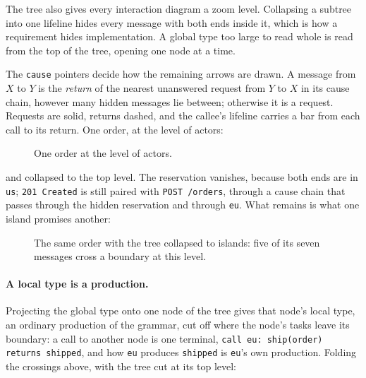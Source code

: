 The tree also gives every interaction diagram a zoom level. Collapsing a subtree
into one lifeline hides every message with both ends inside it, which is how a
requirement hides implementation. A global type too large to read whole is read
from the top of the tree, opening one node at a time.

The \texttt{cause} pointers decide how the remaining arrows are drawn. A message
from $X$ to $Y$ is the \emph{return} of the nearest unanswered request from $Y$
to $X$ in its cause chain, however many hidden messages lie between; otherwise
it is a request. Requests are solid, returns dashed, and the callee's lifeline
carries a bar from each call to its return. One order, at the level of actors:

\begin{figure}[htbp]
\centering
{}
\caption{One order at the level of actors.}
\label{fig:topology-actors}
\end{figure}

and collapsed to the top level. The reservation vanishes, because both ends are
in \texttt{us}; \texttt{201 Created} is still paired with \texttt{POST /orders},
through a cause chain that passes through the hidden reservation and through
\texttt{eu}. What remains is what one island promises another:

\begin{figure}[htbp]
\centering
{}
\caption{The same order with the tree collapsed to islands: five of its seven
messages cross a boundary at this level.}
\label{fig:topology-islands}
\end{figure}

\paragraph{A local type is a production.} Projecting the global type onto one
node of the tree gives that node's local type, an ordinary production of the
grammar, cut off where the node's tasks leave its boundary: a call to another
node is one terminal, \texttt{call eu: ship(order) returns shipped}, and how
\texttt{eu} produces \texttt{shipped} is \texttt{eu}'s own production. Folding
the crossings above, with the tree cut at its top level:

